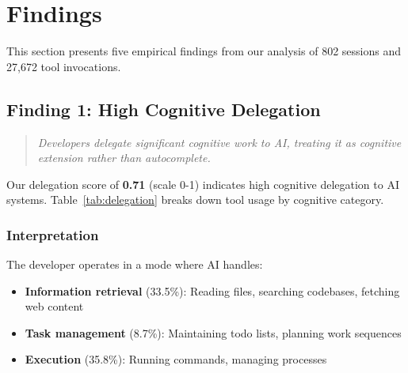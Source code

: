 
\section{Findings}

This section presents five empirical findings from our analysis of 802 sessions and 27,672 tool invocations.

\subsection{Finding 1: High Cognitive Delegation}

\begin{quote}
\textit{Developers delegate significant cognitive work to AI, treating it as cognitive extension rather than autocomplete.}
\end{quote}

Our delegation score of \textbf{0.71} (scale 0-1) indicates high cognitive delegation to AI systems. Table~\ref{tab:delegation} breaks down tool usage by cognitive category.

\begin{table}[h]
\caption{Tool Usage by Cognitive Category}
\label{tab:delegation}
\end{table}

\subsubsection{Interpretation}

The developer operates in a mode where AI handles:
\begin{itemize}
    \item \textbf{Information retrieval} (33.5\%): Reading files, searching codebases, fetching web content
    \item \textbf{Task management} (8.7\%): Maintaining todo lists, planning work sequences
    \item \textbf{Execution} (35.8\%): Running commands, managing processes
\end{itemize}

